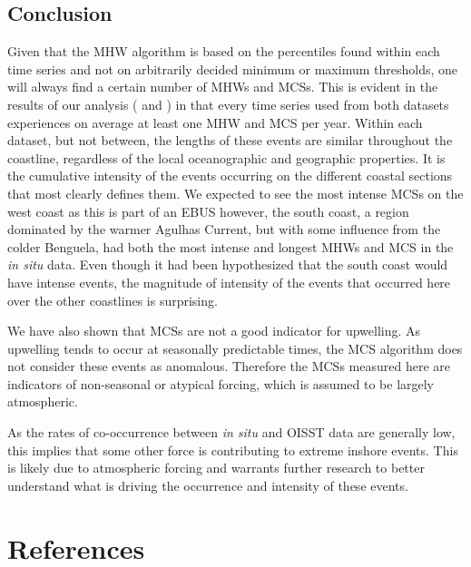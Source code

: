 \documentclass[a4paper,10pt,review]{elsarticle}
\begin{document}
\subsection{Conclusion}
Given that the MHW algorithm is based on the percentiles found within each time series and not on arbitrarily decided minimum or maximum thresholds, one will always find a certain number of MHWs and MCSs. This is evident in the results of our analysis ( and ) in that every time series used from both datasets experiences on average at least one MHW and MCS per year. Within each dataset, but not between, the lengths of these events are similar throughout the coastline, regardless of the local oceanographic and geographic properties.  It is the cumulative intensity of the events occurring on the different coastal sections that most clearly defines them. We expected to see the most intense MCSs on the west coast as this is part of an EBUS however, the south coast, a region dominated by the warmer Agulhas Current, but with some influence from the colder Benguela, had both the most intense and longest MHWs and MCS in the \emph{in situ} data. Even though it had been hypothesized that the south coast would have intense events, the magnitude of intensity of the events that occurred here over the other coastlines is surprising. 

We have also shown that MCSs are not a good indicator for upwelling. As upwelling tends to occur at seasonally predictable times, the MCS algorithm does not consider these events as anomalous. Therefore the MCSs measured here are indicators of non-seasonal or atypical forcing, which is assumed to be largely atmospheric.

As the rates of co-occurrence between \emph{in situ} and OISST data are generally low, this implies that some other force is contributing to extreme inshore events. This is likely due to atmospheric forcing and warrants further research to better understand what is driving the occurrence and intensity of these events.

\section*{References}


\end{document}

